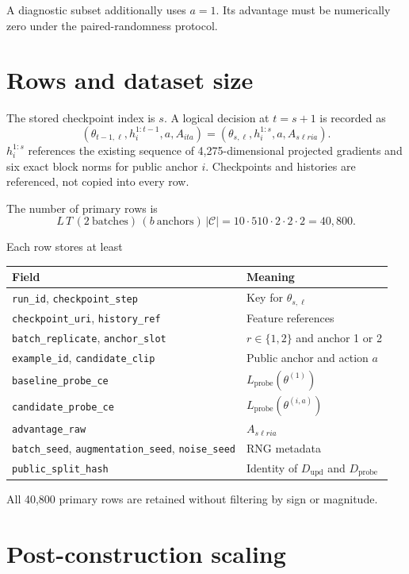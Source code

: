 \documentclass[10pt]{article}
\newcommand{\Dupd}{D_{\mathrm{upd}}}
\newcommand{\Dprobe}{D_{\mathrm{probe}}}
\begin{document}
A diagnostic subset additionally uses $a=1$. Its advantage must be numerically
zero under the paired-randomness protocol.

\section{Rows and dataset size}

The stored checkpoint index is $s$. A logical decision at $t=s+1$ is recorded
as
\[
  (\theta_{t-1,\ell},h_i^{1:t-1},a,A_{ita})
  =(\theta_{s,\ell},h_i^{1:s},a,A_{s\ell ria}).
\]
$h_i^{1:s}$ references the existing sequence of 4,275-dimensional projected
gradients and six exact block norms for public anchor $i$. Checkpoints and
histories are referenced, not copied into every row.

The number of primary rows is
\[
  L\,T\,(2\ \text{batches})\,(b\ \text{anchors})\,|\mathcal C|
  =10\cdot510\cdot2\cdot2\cdot2
  =\boxed{40{,}800}.
\]

Each row stores at least
\begin{center}
\begin{tabular}{ll}
\toprule
Field & Meaning \\
\midrule
\texttt{run\_id}, \texttt{checkpoint\_step} & Key for $\theta_{s,\ell}$ \\
\texttt{checkpoint\_uri}, \texttt{history\_ref} & Feature references \\
\texttt{batch\_replicate}, \texttt{anchor\_slot} & $r\in\{1,2\}$ and anchor 1 or 2 \\
\texttt{example\_id}, \texttt{candidate\_clip} & Public anchor and action $a$ \\
\texttt{baseline\_probe\_ce} & $L_{\mathrm{probe}}(\theta^{(1)})$ \\
\texttt{candidate\_probe\_ce} & $L_{\mathrm{probe}}(\theta^{(i,a)})$ \\
\texttt{advantage\_raw} & $A_{s\ell ria}$ \\
\texttt{batch\_seed}, \texttt{augmentation\_seed}, \texttt{noise\_seed} & RNG metadata \\
\texttt{public\_split\_hash} & Identity of $\Dupd$ and $\Dprobe$ \\
\bottomrule
\end{tabular}
\end{center}
All 40,800 primary rows are retained without filtering by sign or magnitude.

\section{Post-construction scaling}
\end{document}
